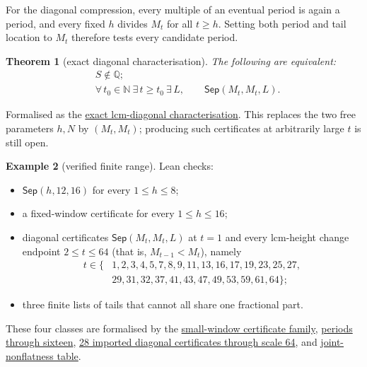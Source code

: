 \documentclass[11pt]{article}
\newcommand{\commit}{99f4bf47422abbd8757cbb22b50ba079d764d3a7}
\newcommand{\repobase}{https://github.com/wcook04/plectis-erdos/blob/\commit}
\newcommand{\PK}{Erdos249257}
\newcommand{\lword}[4]{\href{\repobase/\PK/#1\#L#2}{#4}}
\newtheorem{theorem}{Theorem}[section]
\theoremstyle{definition}
\newtheorem{example}[theorem]{Example}
\theoremstyle{remark}
\newcommand{\N}{\mathbb{N}}
\newcommand{\Q}{\mathbb{Q}}
\begin{document}
For the diagonal compression, every multiple of an eventual period is again
a period, and every fixed \(h\) divides \(M_t\) for all \(t\geq h\).  Setting
both period and tail location to \(M_t\) therefore tests every candidate period.

\begin{theorem}[exact diagonal characterisation]\label{res:diag}
The following are equivalent:
\[
\begin{aligned}
 &S\notin\Q;\\
 &\forall\,t_0\in\N\ \exists\,t\geq t_0\ \exists\,L,\qquad
   \mathsf{Sep}(M_t,M_t,L).
\end{aligned}
\]
\end{theorem}
\noindent Formalised as the
\lword{LcmConeFlatness.lean}{426}{irrational_totient_series_iff_lcm_diagonal_certificate_supply}{exact lcm-diagonal characterisation}.
This replaces the two free parameters \(h,N\) by \((M_t,M_t)\);
producing such certificates at arbitrarily large \(t\) is still open.

\begin{example}[verified finite range]\label{res:deposits}
Lean checks:
\begin{itemize}[leftmargin=1.4em]
\item $\mathsf{Sep}(h,12,16)$ for every $1\le h\le8$;
\item a fixed-window certificate for every $1\le h\le16$;
\item diagonal certificates $\mathsf{Sep}(M_t,M_t,L)$ at $t=1$ and every
lcm-height change endpoint $2\le t\le64$ (that is, $M_{t-1}<M_t$), namely
\[
\begin{aligned}
t\in\{&1,2,3,4,5,7,8,9,11,13,16,17,19,23,25,27,\\
      &29,31,32,37,41,43,47,49,53,59,61,64\};
\end{aligned}
\]
\item three finite lists of tails that cannot all share one fractional part.
\end{itemize}
\end{example}
\noindent These four classes are formalised by the
\lword{TotientTailPeriodKiller.lean}{404}{certifiedKill_all_small}{small-window certificate family},
\lword{CarrySurvivorExtinction.lean}{574}{certifiedKill_all_upto_sixteen}{periods through sixteen},
\lword{DiagonalPincerCertificatesT64.lean}{1967}{certifiedKill_diagonal_all_imported_through_t64}{28 imported diagonal certificates through scale 64},
and
\lword{LcmConeNonflat.lean}{506}{coneNonflatCert_cells}{joint-nonflatness table}.
\end{document}
